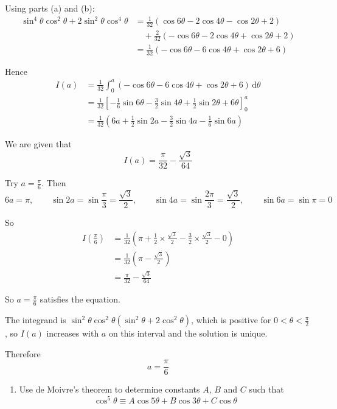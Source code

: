 \documentclass[leqno]{article}
\begin{document}
\begin{enumerate}[
  label=\textbf{\arabic*.},
  leftmargin=*,
  topsep=0pt,
  partopsep=0pt,
  parsep=0pt
]
\begin{djsSolution}
\begin{enumerate}[label=\textbf{(\alph*)}]
Using parts (a) and (b):
\begin{align*}
\sin^4\theta\cos^2\theta+2\sin^2\theta\cos^4\theta
&=\frac{1}{32}\left(\cos 6\theta-2\cos 4\theta-\cos 2\theta+2\right) \\
&\quad +\frac{2}{32}\left(-\cos 6\theta-2\cos 4\theta+\cos 2\theta+2\right) \\
&=\frac{1}{32}\left(-\cos 6\theta-6\cos 4\theta+\cos 2\theta+6\right)
\end{align*}

Hence
\begin{align*}
I(a)
&=\frac{1}{32}\int_0^a\left(-\cos 6\theta-6\cos 4\theta+\cos 2\theta+6\right)\,\mathrm{d}\theta \\
&=\frac{1}{32}\left[-\frac16\sin 6\theta-\frac32\sin 4\theta+\frac12\sin 2\theta+6\theta\right]_0^a \\
&=\frac{1}{32}\left(6a+\frac12\sin 2a-\frac32\sin 4a-\frac16\sin 6a\right)
\end{align*}

We are given that
\[
I(a)=\frac{\pi}{32}-\frac{\sqrt3}{64}
\]

Try \(a=\frac{\pi}{6}\). Then
\[
6a=\pi,\qquad \sin 2a=\sin\frac{\pi}{3}=\frac{\sqrt3}{2},\qquad
\sin 4a=\sin\frac{2\pi}{3}=\frac{\sqrt3}{2},\qquad
\sin 6a=\sin\pi=0
\]

So
\begin{align*}
I\left(\frac{\pi}{6}\right)
&=\frac{1}{32}\left(\pi+\frac12\times\frac{\sqrt3}{2}-\frac32\times\frac{\sqrt3}{2}-0\right) \\
&=\frac{1}{32}\left(\pi-\frac{\sqrt3}{2}\right) \\
&=\frac{\pi}{32}-\frac{\sqrt3}{64}
\end{align*}

So \(a=\frac{\pi}{6}\) satisfies the equation.

The integrand is \(\sin^2\theta\cos^2\theta\left(\sin^2\theta+2\cos^2\theta\right)\), which is positive for \(0<\theta<\frac{\pi}{2}\), so \(I(a)\) increases with \(a\) on this interval and the solution is unique.

Therefore
\[
a=\frac{\pi}{6}
\]
\end{enumerate}
\end{djsSolution}


\newpage

\questionitem


\begin{enumerate}[label=\textbf{(\alph*)}]
  \item Use de Moivre's theorem to determine constants $A$, $B$ and $C$ such that
  \[
  \cos^5 \theta \equiv A\cos 5\theta + B\cos 3\theta + C\cos \theta
  \]
\end{enumerate}



\end{enumerate}
\end{document}
